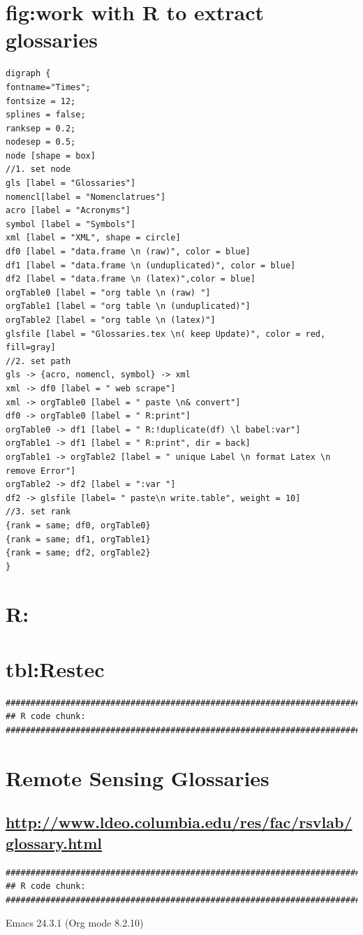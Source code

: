 \documentclass[a4paper,times,12pt,listings-bw,microtype]{article}
\begin{document}
\section{fig:work with R to extract glossaries}
\label{sec-3}
\begin{verbatim}
digraph { 
fontname="Times"; 
fontsize = 12; 
splines = false; 
ranksep = 0.2; 
nodesep = 0.5; 
node [shape = box] 
//1. set node 
gls [label = "Glossaries"]
nomencl[label = "Nomenclatrues"]
acro [label = "Acronyms"]
symbol [label = "Symbols"]
xml [label = "XML", shape = circle]
df0 [label = "data.frame \n (raw)", color = blue]
df1 [label = "data.frame \n (unduplicated)", color = blue]
df2 [label = "data.frame \n (latex)",color = blue]
orgTable0 [label = "org table \n (raw) "]
orgTable1 [label = "org table \n (unduplicated)"]
orgTable2 [label = "org table \n (latex)"]
glsfile [label = "Glossaries.tex \n( keep Update)", color = red, fill=gray]
//2. set path 
gls -> {acro, nomencl, symbol} -> xml
xml -> df0 [label = " web scrape"]
xml -> orgTable0 [label = " paste \n& convert"]
df0 -> orgTable0 [label = " R:print"]
orgTable0 -> df1 [label = " R:!duplicate(df) \l babel:var"]
orgTable1 -> df1 [label = " R:print", dir = back]
orgTable1 -> orgTable2 [label = " unique Label \n format Latex \n remove Error"]
orgTable2 -> df2 [label = ":var "]
df2 -> glsfile [label= " paste\n write.table", weight = 10]
//3. set rank 
{rank = same; df0, orgTable0} 
{rank = same; df1, orgTable1} 
{rank = same; df2, orgTable2} 
}
\end{verbatim}



\section{R:}
\label{sec-4}

\section{tbl:Restec}
\label{sec-5}
\begin{verbatim}
###############################################################################
## R code chunk:
###############################################################################
\end{verbatim}
\section{Remote Sensing Glossaries}
\label{sec-6}

\subsection{\url{http://www.ldeo.columbia.edu/res/fac/rsvlab/glossary.html}}
\label{sec-6-1}
\begin{verbatim}
###############################################################################
## R code chunk:
###############################################################################
\end{verbatim}
Emacs 24.3.1 (Org mode 8.2.10)
\end{document}
